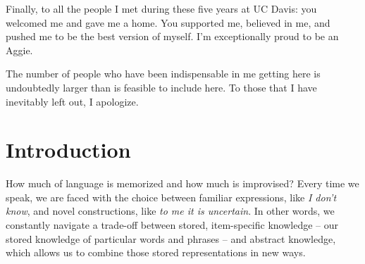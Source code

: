 \documentclass[
  12pt,
  letterpaper,
]{scrreprt}
\begin{document}
Finally, to all the people I met during these five years at UC Davis:
you welcomed me and gave me a home. You supported me, believed in me,
and pushed me to be the best version of myself. I'm exceptionally proud
to be an Aggie.

The number of people who have been indispensable in me getting here is
undoubtedly larger than is feasible to include here. To those that I
have inevitably left out, I apologize.


\chapter{Introduction}\label{introduction}


\doublespacing

\setlength{\parindent}{4em}

How much of language is memorized and how much is improvised? Every time
we speak, we are faced with the choice between familiar expressions,
like \emph{I don't know}, and novel constructions, like \emph{to me it
is uncertain}. In other words, we constantly navigate a trade-off
between stored, item-specific knowledge -- our stored knowledge of
particular words and phrases -- and abstract knowledge, which allows us
to combine those stored representations in new ways.
\end{document}
